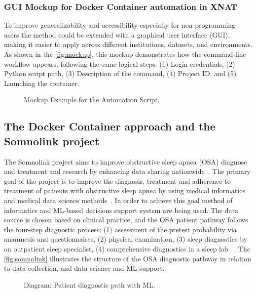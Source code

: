 \normalsize
\subsubsection{GUI Mockup for Docker Container automation in XNAT}
\normalsize
To improve generalizability and accessibility especially for non-programming users the method could be extended with a graphical user interface (GUI), making it easier to apply across different institutions, datasets, and environments.  As shown in the \autoref{fig:mockup}, this mockup demonstrates how the command-line workflow appears, following the same logical steps: (1) Login credentials, (2) Python script path, (3) Description of the command, (4) Project ID, and (5) Launching the container.
\normalsize
\begin{figure}[H]
    \centering
    \def\svgwidth{\linewidth} 
    
    \caption{ Mockup Example for the Automation Script.}
    \label{fig:mockup}
\end{figure}
\normalsize
\subsection{The Docker Container approach and the Somnolink project}

The Somnolink project aims to improve obstructive sleep apnea (OSA) diagnose and  treatment and research by enhancing data sharing nationwide~\cite{krefting_somnolink_2025}. The primary goal of the project is to improve the diagnosis, treatment and adherence to treatment of patients with obstructive sleep apnea by using medical informatics and medical data science methods~\cite{aimsomnilink}.
In order to achieve this goal method of informatics and ML-based decisions support system are being used. 
The data source is chosen based on clinical practice, and the OSA patient pathway follows the four-step diagnostic process: (1) assessment of the pretest probability via anamnesis and questionnaires, (2) physical examination, (3) sleep diagnostics by an outpatient sleep specialist, (4) comprehensive diagnostics in a sleep lab ~\cite{krefting_somnolink_2025}.
The \autoref{fig:somnolink} illustrates the structure of the OSA diagnostic pathway in relation to data collection, and data science and ML support.
\begin{figure}[H]
    \centering
    \def\svgwidth{\linewidth} 
    
    \caption{Diagram: Patient diagnostic path with ML.}
    \label{fig:somnolink}
\end{figure}

